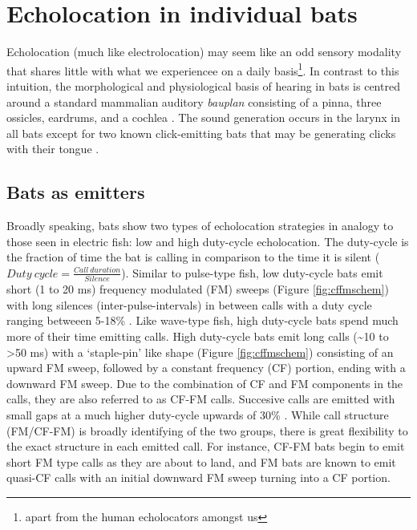 \documentclass[
]{book}
\begin{document}
\hypertarget{echolocation-in-individual-bats}{%
\section{Echolocation in individual bats}\label{echolocation-in-individual-bats}}

Echolocation (much like electrolocation) may seem like an odd sensory modality that shares little with what we experiencee on a daily basis\footnote{apart from the human echolocators amongst us}. In contrast to this intuition, the morphological and physiological basis of hearing in bats is centred around a standard mammalian auditory \emph{bauplan} consisting of a pinna, three ossicles, eardrums, and a cochlea \citep{neuweiler2000biology}. The sound generation occurs in the larynx in all bats except for two known click-emitting bats that may be generating clicks with their tongue \citep{fenton2013a}.

\hypertarget{batemitters}{%
\subsection{Bats as emitters}\label{batemitters}}

Broadly speaking, bats show two types of echolocation strategies in analogy to those seen in electric fish: low and high duty-cycle echolocation. The duty-cycle is the fraction of time the bat is calling in comparison to the time it is silent (\(Duty \:cycle=\frac{Call\:duration}{Silence}\)). Similar to pulse-type fish, low duty-cycle bats emit short (1 to 20 ms) frequency modulated (FM) sweeps (Figure \ref{fig:cffmschem}) \citep[\citet{fenton1995natural}]{fenton2012evolution} with long silences (inter-pulse-intervals) in between calls with a duty cycle ranging betweeen 5-18\% \citep{fenton2013a}. Like wave-type fish, high duty-cycle bats spend much more of their time emitting calls. High duty-cycle bats emit long calls (\textasciitilde10 to \textgreater50 ms) with a `staple-pin' like shape (Figure \ref{fig:cffmschem}) consisting of an upward FM sweep, followed by a constant frequency (CF) portion, ending with a downward FM sweep. Due to the combination of CF and FM components in the calls, they are also referred to as CF-FM calls. Succesive calls are emitted with small gaps at a much higher duty-cycle upwards of 30\% \citep{fenton2012evolution}. While call structure (FM/CF-FM) is broadly identifying of the two groups, there is great flexibility to the exact structure in each emitted call. For instance, CF-FM bats begin to emit short FM type calls as they are about to land, and FM bats are known to emit quasi-CF calls with an initial downward FM sweep turning into a CF portion.
\end{document}
